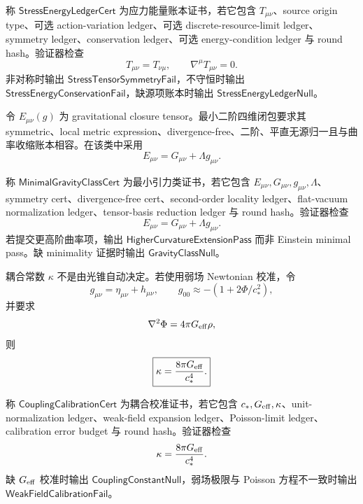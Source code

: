 \begin{definition}[应力能量账本证书]\label{def:typed-address-biaxial-completion-stress-energy-ledger-cert}
称 \(\mathsf{StressEnergyLedgerCert}\) 为应力能量账本证书，若它包含 \(T_{\mu\nu}\)、source origin type、可选 action-variation ledger、可选 discrete-resource-limit ledger、symmetry ledger、conservation ledger、可选 energy-condition ledger 与 round hash。验证器检查
\[
T_{\mu\nu}=T_{\nu\mu},
\qquad
\nabla^\mu T_{\mu\nu}=0.
\]
非对称时输出 \(\mathsf{StressTensorSymmetryFail}\)，不守恒时输出 \(\mathsf{StressEnergyConservationFail}\)，缺源项账本时输出 \(\mathsf{StressEnergyLedgerNull}\)。
\end{definition}

令 \(E_{\mu\nu}(g)\) 为 gravitational closure tensor。最小二阶四维闭包要求其 symmetric、local metric expression、divergence-free、二阶、平直无源归一且与曲率收缩账本相容。在该类中采用
\[
\boxed{
E_{\mu\nu}=G_{\mu\nu}+\Lambda g_{\mu\nu}.
}
\]

\begin{definition}[最小引力类证书]\label{def:typed-address-biaxial-completion-minimal-gravity-class-cert}
称 \(\mathsf{MinimalGravityClassCert}\) 为最小引力类证书，若它包含 \(E_{\mu\nu},G_{\mu\nu},g_{\mu\nu},\Lambda\)、symmetry cert、divergence-free cert、second-order locality ledger、flat-vacuum normalization ledger、tensor-basis reduction ledger 与 round hash。验证器检查
\[
E_{\mu\nu}=G_{\mu\nu}+\Lambda g_{\mu\nu}.
\]
若提交更高阶曲率项，输出 \(\mathsf{HigherCurvatureExtensionPass}\) 而非 Einstein minimal pass。缺 minimality 证据时输出 \(\mathsf{GravityClassNull}\)。
\end{definition}

耦合常数 \(\kappa\) 不是由光锥自动决定。若使用弱场 Newtonian 校准，令
\[
g_{\mu\nu}=\eta_{\mu\nu}+h_{\mu\nu},
\qquad
g_{00}\approx-(1+2\Phi/c_\ast^2),
\]
并要求
\[
\nabla^2\Phi=4\pi G_{\rm eff}\rho,
\]
则
\[
\boxed{
\kappa=\frac{8\pi G_{\rm eff}}{c_\ast^4}.
}
\]

\begin{definition}[耦合校准证书]\label{def:typed-address-biaxial-completion-coupling-calibration-cert}
称 \(\mathsf{CouplingCalibrationCert}\) 为耦合校准证书，若它包含 \(c_\ast,G_{\rm eff},\kappa\)、unit-normalization ledger、weak-field expansion ledger、Poisson-limit ledger、calibration error budget 与 round hash。验证器检查
\[
\kappa=\frac{8\pi G_{\rm eff}}{c_\ast^4}.
\]
缺 \(G_{\rm eff}\) 校准时输出 \(\mathsf{CouplingConstantNull}\)，弱场极限与 Poisson 方程不一致时输出 \(\mathsf{WeakFieldCalibrationFail}\)。
\end{definition}

